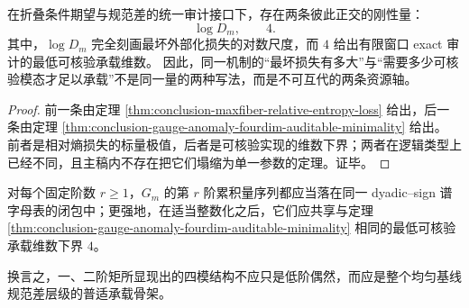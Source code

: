 \begin{proposition}[损失幅值轴与承载维数轴的分裂]\label{prop:conclusion-maxfiber-loss-vs-fourmode-carrier}
在折叠条件期望与规范差的统一审计接口下，存在两条彼此正交的刚性量：
\[
\log D_m,
\qquad
4.
\]
其中，\(\log D_m\) 完全刻画最坏外部化损失的对数尺度，而 \(4\) 给出有限窗口 exact 审计的最低可核验承载维数。
因此，同一机制的“最坏损失有多大”与“需要多少可核验模态才足以承载”不是同一量的两种写法，而是不可互代的两条资源轴。
\end{proposition}
\begin{proof}
前一条由定理 \ref{thm:conclusion-maxfiber-relative-entropy-loss} 给出，后一条由定理 \ref{thm:conclusion-gauge-anomaly-fourdim-auditable-minimality} 给出。
前者是相对熵损失的标量极值，后者是可核验实现的维数下界；两者在逻辑类型上已经不同，且主稿内不存在把它们塌缩为单一参数的定理。证毕。
\end{proof}

\begin{conjecture}[均匀基线规范差的四模普适性]\label{conj:conclusion-gauge-anomaly-fourmode-universality}
对每个固定阶数 \(r\ge 1\)，\(G_m\) 的第 \(r\) 阶累积量序列都应当落在同一 dyadic--sign 谱字母表的闭包中；更强地，在适当整数化之后，它们应共享与定理 \ref{thm:conclusion-gauge-anomaly-fourdim-auditable-minimality} 相同的最低可核验承载维数下界 \(4\)。

换言之，一、二阶矩所显现出的四模结构不应只是低阶偶然，而应是整个均匀基线规范差层级的普适承载骨架。
\end{conjecture}
